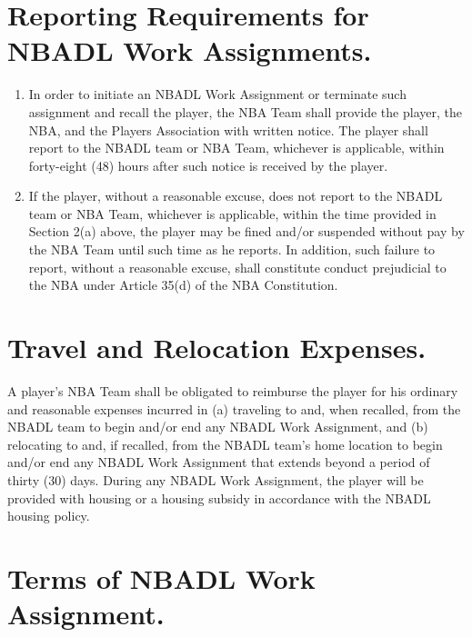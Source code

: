 \documentclass[
]{book}
\providecommand{\tightlist}{%
  \setlength{\itemsep}{0pt}\setlength{\parskip}{0pt}}
\begin{document}
\hypertarget{reporting-requirements-for-nbadl-work-assignments.}{%
\section{Reporting Requirements for NBADL Work Assignments.}\label{reporting-requirements-for-nbadl-work-assignments.}}

\begin{enumerate}
\def\labelenumi{(\alph{enumi})}
\tightlist
\item
  In order to initiate an NBADL Work Assignment or terminate such assignment and recall the player, the NBA Team shall provide the player, the NBA, and the Players Association with written notice. The player shall report to the NBADL team or NBA Team, whichever is applicable, within forty-eight (48) hours after such notice is received by the player.
\item
  If the player, without a reasonable excuse, does not report to the NBADL team or NBA Team, whichever is applicable, within the time provided in Section 2(a) above, the player may be fined and/or suspended without pay by the NBA Team until such time as he reports. In addition, such failure to report, without a reasonable excuse, shall constitute conduct prejudicial to the NBA under Article 35(d) of the NBA Constitution.
\end{enumerate}

\hypertarget{travel-and-relocation-expenses.}{%
\section{Travel and Relocation Expenses.}\label{travel-and-relocation-expenses.}}

A player's NBA Team shall be obligated to reimburse the player for his ordinary and reasonable expenses incurred in (a) traveling to and, when recalled, from the NBADL team to begin and/or end any NBADL Work Assignment, and (b) relocating to and, if recalled, from the NBADL team's home location to begin and/or end any NBADL Work Assignment that extends beyond a period of thirty (30) days. During any NBADL Work Assignment, the player will be provided with housing or a housing subsidy in accordance with the NBADL housing policy.

\hypertarget{terms-of-nbadl-work-assignment.}{%
\section{Terms of NBADL Work Assignment.}\label{terms-of-nbadl-work-assignment.}}
\end{document}
